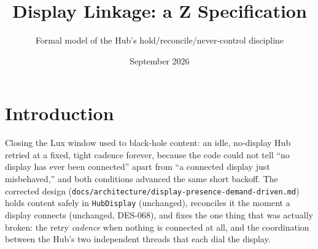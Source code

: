 \documentclass[a4paper,10pt,fleqn]{article}
\begin{document}
\title{Display Linkage: a Z Specification}
\author{Formal model of the Hub's hold/reconcile/never-control discipline}
\date{September 2026}
\maketitle

\section{Introduction}

Closing the Lux window used to black-hole content: an idle, no-display Hub
retried at a fixed, tight cadence forever, because the code could not tell
``no display has ever been connected'' apart from ``a connected display just
misbehaved,'' and both conditions advanced the same short backoff.  The
corrected design (\texttt{docs/architecture/display-presence-demand-driven.md})
holds content safely in \texttt{HubDisplay} (unchanged), reconciles it the
moment a display connects (unchanged, DES-068), and fixes the one thing that
was actually broken: the retry \emph{cadence} when nothing is connected at
all, and the coordination between the Hub's two independent threads that
each dial the display.
\end{document}
